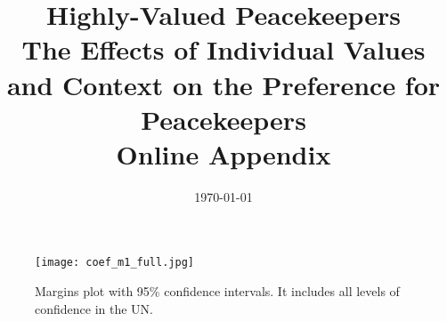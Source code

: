 \documentclass[12pt]{article}
\title{Highly-Valued Peacekeepers \\
\large The Effects of Individual Values and Context on the Preference for Peacekeepers \\
\textbf{Online Appendix}}
\date{\today}
\renewcommand{\thesection}{\Roman{section}}
\begin{document}
\begin{titlingpage}
\maketitle
\end{titlingpage}


\appendix 

\renewcommand{\thesection}{Appendix \Alph{section}}
\setcounter{section}{0}

\renewcommand{\thetable}{\Alph{section}\arabic{table}}
\setcounter{table}{0}

\renewcommand{\thefigure}{\Alph{section}\arabic{figure}}
\setcounter{figure}{0}


\begin{centering}
\section{}
\end{centering}

\begin{centering}

\end{centering}

\clearpage

\begin{centering}
\section{}
\setcounter{table}{0}
\setcounter{figure}{0}
\end{centering}


\begin{centering}

\label{Table 4}
\end{centering}

\begin{centering}

\label{Table 5}
\end{centering}

\clearpage

\begin{centering}
\section{}
\setcounter{table}{0}
\setcounter{figure}{0}
\end{centering}


\begin{figure}[h!]
\begin{centering}
\texttt{[image: coef\_m1\_full.jpg]}
\caption{\small Margins plot with 95\% confidence intervals. It includes all levels of confidence in the UN.}
\label{figure 3}
\end{centering}
\end{figure}
\end{document}
